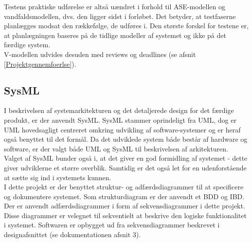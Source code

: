 Testens praktiske udførelse er altså uændret i forhold til ASE-modellen og vandfaldsmodellen, dvs. den ligger sidst i forløbet. Det betyder, at testfaserne planlægges modsat den rækkefølge, de udføres i. Den største forskel for testene er, at planlægningen baseres på de tidlige modeller af systemet og ikke på det færdige system. \\
 V-modellen udvides desuden med reviews og deadlines (se afsnit \ref{Projektgennemfoerlse}).

\subsection{SysML}
 I beskrivelsen af systemarkitekturen og det detaljerede design for det færdige produkt, er der anvendt SysML. SysML stammer oprindeligt fra UML, dog er UML hovedsagligt centreret omkring udvikling af software-systemer og er heraf også benyttet til det formål. Da det udviklede system både består af hardware og software, er der valgt både UML og SysML til beskrivelsen af arkitekturen.\\
Valget af SysML bunder også i, at det giver en god formidling af systemet - dette giver udviklerne et større overblik. Samtidig er det også let for en udenforstående at sætte sig ind i systemets kunnen.\\
I dette projekt er der benyttet struktur- og adfærdsdiagrammer til at specificere og dokumentere systemet. Som strukturdiagram er der anvendt et BDD og IBD.\\
Der er anvendt adfærdsdiagrammer i form af sekvensdiagrammer i dette projekt. Disse diagrammer er velegnet til sekventielt at beskrive den logiske funktionalitet i systemet. Softwaren er opbygget ud fra sekvensdiagrammer beskrevet i designafsnittet (se dokumentationen afsnit 3).

